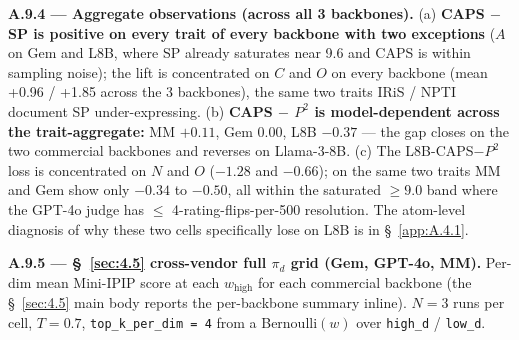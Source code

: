 \label{app:A.9.4}
\textbf{A.9.4 --- Aggregate observations (across all 3 backbones).} (a) \textbf{CAPS $-$ SP is positive on every trait of every backbone with two exceptions} ($A$ on Gem and L8B, where SP already saturates near 9.6 and CAPS is within sampling noise); the lift is concentrated on $C$ and $O$ on every backbone (mean +0.96 / +1.85 across the 3 backbones), the same two traits IRiS / NPTI document SP under-expressing. (b) \textbf{CAPS $-$ $P^{\!2}$ is model-dependent across the trait-aggregate:} MM $+0.11$, Gem $0.00$, L8B $-0.37$ --- the gap closes on the two commercial backbones and reverses on Llama-3-8B. (c) The L8B-CAPS$-$$P^{\!2}$ loss is concentrated on $N$ and $O$ ($-1.28$ and $-0.66$); on the same two traits MM and Gem show only $-0.34$ to $-0.50$, all within the saturated $\geq 9.0$ band where the GPT-4o judge has $\leq$ 4-rating-flips-per-500 resolution. The atom-level diagnosis of why these two cells specifically lose on L8B is in \S~\ref{app:A.4.1}.

\label{app:A.9.5}
\textbf{A.9.5 --- \S~\ref{sec:4.5} cross-vendor full $\pi_d$ grid (Gem, GPT-4o, MM).} Per-dim mean Mini-IPIP score at each $w_\text{high}$ for each commercial backbone (the \S~\ref{sec:4.5} main body reports the per-backbone summary inline). $N=3$ runs per cell, $T=0.7$, \texttt{top\_\allowbreak{}k\_\allowbreak{}per\_\allowbreak{}dim = 4} from a Bernoulli$(w)$ over \texttt{high\_\allowbreak{}d} / \texttt{low\_\allowbreak{}d}.

